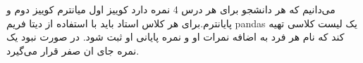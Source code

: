 می‌دانیم که هر دانشجو برای هر درس 4 نمره دارد کوییز اول میانترم کوییز دوم و پایانترم.برای هر کلاس استاد باید با استفاده از دیتا فریم pandas یک لیست کلاسی تهیه کند که نام هر فرد به اضافه نمرات او و نمره پایانی او  ثبت شود. در صورت نبود یک نمره جای ان صفر قرار می‌گیرد.